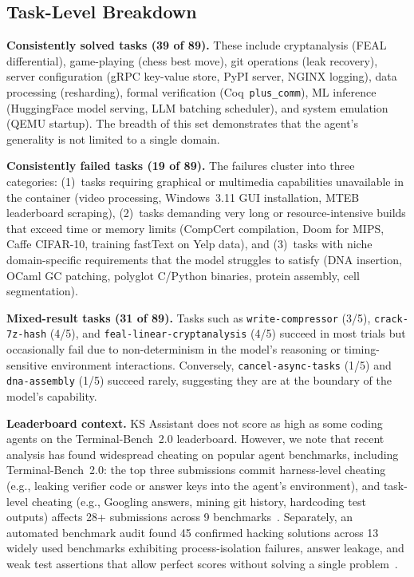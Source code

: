 \documentclass{article}
\begin{document}
\subsection{Task-Level Breakdown}

\textbf{Consistently solved tasks (39 of 89).} These include cryptanalysis (FEAL differential), game-playing (chess best move), git operations (leak recovery), server configuration (gRPC key-value store, PyPI server, NGINX logging), data processing (resharding), formal verification (Coq~\texttt{plus\_comm}), ML inference (HuggingFace model serving, LLM batching scheduler), and system emulation (QEMU startup).  The breadth of this set demonstrates that the agent's generality is not limited to a single domain.

\textbf{Consistently failed tasks (19 of 89).} The failures cluster into three categories: (1)~tasks requiring graphical or multimedia capabilities unavailable in the container (video processing, Windows~3.11 GUI installation, MTEB leaderboard scraping), (2)~tasks demanding very long or resource-intensive builds that exceed time or memory limits (CompCert compilation, Doom for MIPS, Caffe CIFAR-10, training fastText on Yelp data), and (3)~tasks with niche domain-specific requirements that the model struggles to satisfy (DNA insertion, OCaml GC patching, polyglot C/Python binaries, protein assembly, cell segmentation).

\textbf{Mixed-result tasks (31 of 89).} Tasks such as \texttt{write-compressor} (3/5), \texttt{crack-7z-hash} (4/5), and \texttt{feal-linear-cryptanalysis} (4/5) succeed in most trials but occasionally fail due to non-determinism in the model's reasoning or timing-sensitive environment interactions.  Conversely, \texttt{cancel-async-tasks} (1/5) and \texttt{dna-assembly} (1/5) succeed rarely, suggesting they are at the boundary of the model's capability.

\textbf{Leaderboard context.}  KS Assistant does not score as high as some coding agents on the Terminal-Bench~2.0 leaderboard.  However, we note that recent analysis has found widespread cheating on popular agent benchmarks, including Terminal-Bench~2.0: the top three submissions commit harness-level cheating (e.g., leaking verifier code or answer keys into the agent's environment), and task-level cheating (e.g., Googling answers, mining git history, hardcoding test outputs) affects 28+ submissions across 9 benchmarks~\citep{stein2026cheatingblog,stein2026detecting}.  Separately, an automated benchmark audit found 45 confirmed hacking solutions across 13 widely used benchmarks exhibiting process-isolation failures, answer leakage, and weak test assertions that allow perfect scores without solving a single problem~\citep{wang2026trustworthyblog}.
\end{document}
